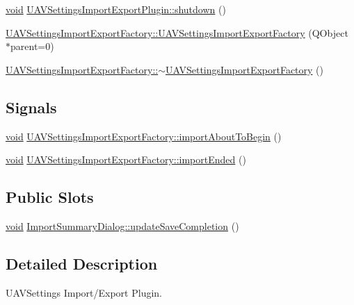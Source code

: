 \begin{DoxyCompactItemize}
\item 
\hyperlink{group___u_a_v_objects_plugin_ga444cf2ff3f0ecbe028adce838d373f5c}{void} \hyperlink{group___u_a_v_settings_import_export_ga5e2dd335427148df64c9b2b3b9a16e8d}{\-U\-A\-V\-Settings\-Import\-Export\-Plugin\-::shutdown} ()
\item 
\hyperlink{group___u_a_v_settings_import_export_ga487d479be4ae96eddde7372c94c27bd7}{\-U\-A\-V\-Settings\-Import\-Export\-Factory\-::\-U\-A\-V\-Settings\-Import\-Export\-Factory} (\-Q\-Object $\ast$parent=0)
\item 
\hyperlink{group___u_a_v_settings_import_export_gac83bc105170e6ccdb6e39818edd45b57}{\-U\-A\-V\-Settings\-Import\-Export\-Factory\-::$\sim$\-U\-A\-V\-Settings\-Import\-Export\-Factory} ()
\end{DoxyCompactItemize}
\subsection*{\-Signals}
\begin{DoxyCompactItemize}
\item 
\hyperlink{group___u_a_v_objects_plugin_ga444cf2ff3f0ecbe028adce838d373f5c}{void} \hyperlink{group___u_a_v_settings_import_export_ga1d7a913adac9094e20d9086a8a1cb5c3}{\-U\-A\-V\-Settings\-Import\-Export\-Factory\-::import\-About\-To\-Begin} ()
\item 
\hyperlink{group___u_a_v_objects_plugin_ga444cf2ff3f0ecbe028adce838d373f5c}{void} \hyperlink{group___u_a_v_settings_import_export_ga456326e359badf7b245abf501d9a6006}{\-U\-A\-V\-Settings\-Import\-Export\-Factory\-::import\-Ended} ()
\end{DoxyCompactItemize}
\subsection*{\-Public \-Slots}
\begin{DoxyCompactItemize}
\item 
\hyperlink{group___u_a_v_objects_plugin_ga444cf2ff3f0ecbe028adce838d373f5c}{void} \hyperlink{group___u_a_v_settings_import_export_gaf0532662634d23c11f3812ece8a170bb}{\-Import\-Summary\-Dialog\-::update\-Save\-Completion} ()
\end{DoxyCompactItemize}


\subsection{\-Detailed \-Description}
\-U\-A\-V\-Settings \-Import/\-Export \-Plugin. 


